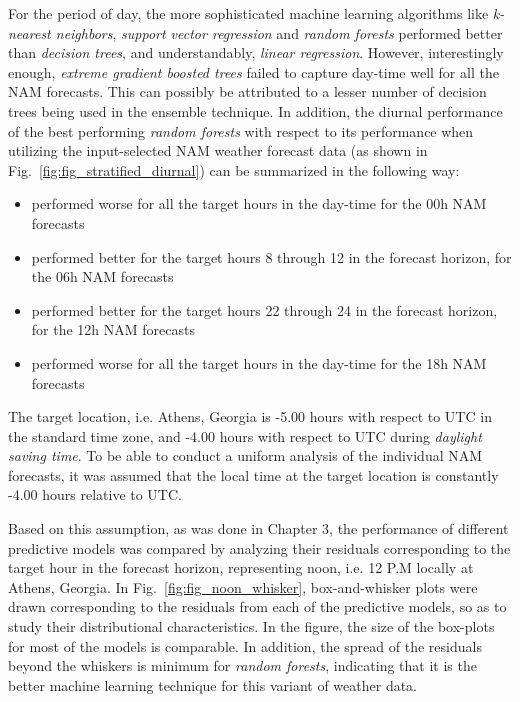 \par For the period of day, the more sophisticated machine learning algorithms like \textit{k-nearest neighbors}, \textit{support vector regression} and \textit{random forests} performed better than \textit{decision trees}, and understandably, \textit{linear regression}. However, interestingly enough, \textit{extreme gradient boosted trees} failed to capture day-time well for all the NAM forecasts. This can possibly be attributed to a lesser number of decision trees being used in the ensemble technique. In addition, the diurnal performance of the best performing \textit{random forests} with respect to its performance when utilizing the input-selected NAM weather forecast data (as shown in Fig.~\ref{fig:fig_stratified_diurnal}) can be summarized in the following way:
\begin{itemize}[noitemsep]
    \item performed worse for all the target hours in the day-time for the 00h NAM forecasts
    \item performed better for the target hours 8 through 12 in the forecast horizon, for the 06h NAM forecasts
    \item performed better for the target hours 22 through 24 in the forecast horizon, for the 12h NAM forecasts
    \item performed worse for all the target hours in the day-time for the 18h NAM forecasts
\end{itemize}

\par The target location, i.e. Athens, Georgia is -5.00 hours with respect to UTC in the standard time zone, and -4.00 hours with respect to UTC during \textit{daylight saving time}. To be able to conduct a uniform analysis of the individual NAM forecasts, it was assumed that the local time at the target location is constantly -4.00 hours relative to UTC. 

\par Based on this assumption, as was done in Chapter 3, the performance of different predictive models was compared by analyzing their residuals corresponding to the target hour in the forecast horizon, representing noon, i.e. 12 P.M locally at Athens, Georgia. In Fig.~\ref{fig:fig_noon_whisker}, box-and-whisker plots were drawn corresponding to the residuals from each of the predictive models, so as to study their distributional characteristics. In the figure, the size of the box-plots for most of the models is comparable. In addition, the spread of the residuals beyond the whiskers is minimum for \textit{random forests}, indicating that it is the better machine learning technique for this variant of weather data.

